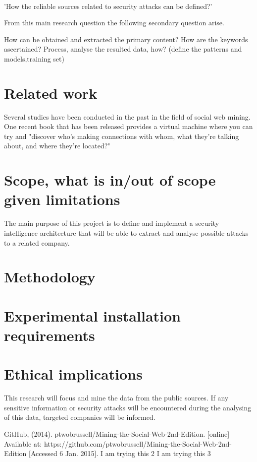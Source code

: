 \documentclass[11pt]{report}
\begin{document}
\paragraph{}

'How the reliable sources related to security attacks can be defined?'

From this main research question the following secondary question arise. 

How can be obtained and extracted the primary content?
How are the keywords ascertained?
Process, analyse the resulted data, how? (define the patterns and models,training set)


\section*{Related work}

Several studies have been conducted in the past in the field of social web mining. One recent book that has been released provides a virtual machine where you can try and "discover who’s making connections with whom, what they’re talking about, and where they’re located?" \label{some:try}

\section*{Scope, what is in/out of scope given limitations}

The main purpose of this project is to define and implement a security intelligence architecture that will be able to extract and analyse possible attacks to a related company. 

 
\section*{Methodology}

\section*{Experimental installation requirements}


\section*{Ethical implications}

This research will focus and mine the data from the public sources. If any sensitive information or security attacks will be encountered during the analysing of this data, targeted companies will be informed. 




\begin{thebibliography}{1}
  GitHub, (2014). ptwobrussell/Mining-the-Social-Web-2nd-Edition. [online] Available at: https://github.com/ptwobrussell/Mining-the-Social-Web-2nd-Edition [Accessed 6 Jan. 2015].
  I am trying this 2 
  I am trying this 3
\end{thebibliography}
\end{document}
